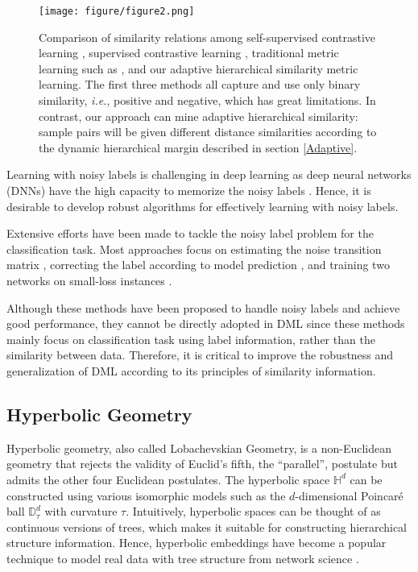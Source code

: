 \documentclass[lettersize,journal]{IEEEtran}
\begin{document}
\begin{figure*}[!t]
	\centering
	\texttt{[image: figure/figure2.png]}
	\caption{Comparison of similarity relations among self-supervised contrastive learning \cite{chen2020simple}, supervised contrastive learning \cite{khosla2020supervised}, traditional metric learning such as \cite{oh2016deep,wang2019multi}, and our adaptive hierarchical similarity metric learning. The first three methods all capture and use only binary similarity, \textit{i.e.}, positive and negative, which has great limitations. In contrast, our approach can mine adaptive hierarchical similarity: sample pairs will be given different distance similarities according to the dynamic hierarchical margin described in section \ref{Adaptive}. }
	\label{comparison}
\end{figure*}

 Learning with noisy labels is challenging in deep learning as deep neural networks (DNNs) have the high capacity to memorize the noisy labels \cite{arpit2017closer,zhang2021understanding}. Hence, it is desirable to develop robust algorithms for effectively learning with noisy labels.
 
 Extensive efforts \cite{patrini2017making,han2018co,sugiyama2018co,xia2019anchor,wei2020combating,li2020dividemix} have been made to tackle the noisy label problem for the classification task. Most approaches focus on estimating the noise transition matrix \cite{patrini2017making,xia2019anchor}, correcting the label according to model prediction \cite{ma2018dimensionality,li2020dividemix}, and training two networks on small-loss instances \cite{han2018co,wei2020combating}.
 
 Although these methods  have been proposed to handle noisy labels and achieve good performance, they cannot be directly adopted in DML since these methods mainly focus on  classification task using label information, rather than the similarity between data. Therefore, it is critical to improve the robustness and generalization of DML according to its principles of similarity information.


\subsection{Hyperbolic Geometry}
Hyperbolic geometry, also called Lobachevskian Geometry, is a non-Euclidean geometry that rejects the validity of Euclid’s fifth, the “parallel”, postulate but admits the other four Euclidean postulates.  The hyperbolic space $\mathbb{H}^d$ can be constructed using various isomorphic models such as the $d$-dimensional Poincar{\'e} ball $\mathbb{D}^d_{\tau}$ with curvature $\tau$. Intuitively, hyperbolic spaces can be thought of as continuous versions of trees, which makes it suitable for constructing hierarchical structure information. Hence, hyperbolic embeddings have become a popular technique to model real data with tree structure from network science \cite{nickel2017poincare,tifrea2018poincar,chami2019hyperbolic,mathieu2019continuous,monath2019gradient,khrulkov2020hyperbolic}.
\end{document}
